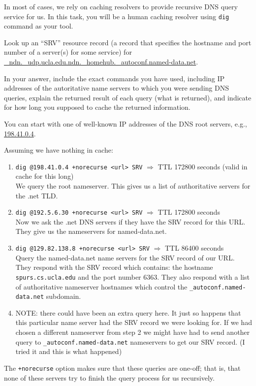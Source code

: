 \documentclass{report}
\begin{document}
\clearpage
\begin{problem}

In most of cases, we rely on caching resolvers to provide recursive DNS query
service for us. In this task, you will be a human caching resolver using
\verb|dig| command as your tool.

Look up an ``SRV'' resource record (a record that specifies the hostname and
port number of a server(s) for some service) for
\url{_ndn._udp.ucla.edu.ndn._homehub._autoconf.named-data.net}.

In your answer, include the exact commands you have used, including IP
addresses of the autoritative name servers to which you were sending DNS
queries, explain the returned result of each query (what is returned), and
indicate for how long you supposed to cache the returned information.

You can start with one of well-known IP addresses of the DNS root servers,
e.g., \url{198.41.0.4}.

\begin{answer}{30em}
  Assuming we have nothing in cache: \\
  \begin{enumerate}
  \item \texttt{dig @198.41.0.4 +norecurse <url> SRV} $\Rightarrow$ TTL 172800 seconds (valid in cache for this long) \\
        We query the root nameserver. This gives us a list of authoritative
        servers for the .net TLD.

  \item \texttt{dig @192.5.6.30 +norecurse <url> SRV} $\Rightarrow$ TTL 172800 seconds \\
        Now we ask the .net DNS servers if they have the SRV record for this
        URL. They give us the nameservers for named-data.net.

  \item \texttt{dig @129.82.138.8 +norecurse <url> SRV} $\Rightarrow$ TTL 86400 seconds \\
        Query the named-data.net name servers for the SRV record of our URL.
        They respond with the SRV record which contains: the hostname
        \texttt{spurs.cs.ucla.edu} and the port number 6363. They also respond
        with a list of authoritative nameserver hostnames which control the
        \texttt{\_autoconf.named-data.net} subdomain.

  \item NOTE: there could have been an extra query here. It just so happens
        that this particular name server had the SRV record we were looking for.
        If we had chosen a different nameserver from step 2 we might have had to
        send another query to \texttt{\_autoconf.named-data.net} nameservers to
        get our SRV record.
        (I tried it and this is what happened)
  \end{enumerate}

  The \texttt{+norecurse} option makes sure that these queries are one-off; that is, that none
  of these servers try to finish the query process for us recursively.
\end{answer}

\end{problem}
\end{document}
